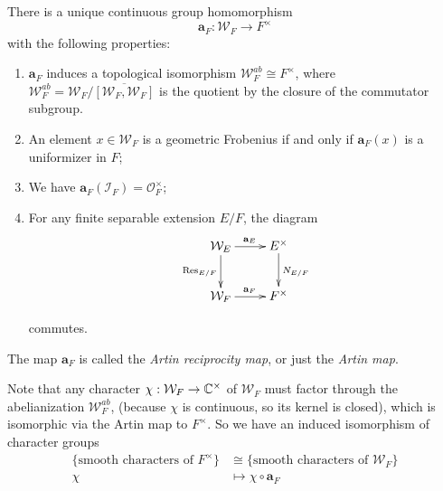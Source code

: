 \begin{thm}\label{thm:lcf}
	There is a unique continuous group homomorphism
	\[\mathbf{a}_F: \mathcal{W}_F\to F^\times\]
	with the following properties:
	\begin{enumerate}
		\item $\mathbf{a}_F$ induces a topological isomorphism $\mathcal{W}_F^{ab}\cong F^\times$, where $\mathcal{W}_F^{ab} = \mathcal{W}_F/\overline{[\mathcal{W}_F, \mathcal{W}_F]}$ is the quotient by the closure of the commutator subgroup.
		\item An element $x\in \mathcal{W}_F$ is a geometric Frobenius if and only if $\mathbf{a}_F(x)$ is a uniformizer in $F$;
		\item We have $\mathbf{a}_F(\mathcal{I}_F) = \mathcal{O}_F^\times$;
		\item For any finite separable extension $E/F$, the diagram 
		$$\xymatrix{
			\mathcal W_E \ar[r]^{\mathbf a_E} \ar[d]_{\Res_{E/F}} & E^\times \ar[d]^{N_{E/F}} \\
			\mathcal W_F \ar[r]^{\mathbf a_F} & F^\times
		}$$
		
		commutes.
	\end{enumerate}
	The map $\mathbf{a}_F$ is called the \emph{Artin reciprocity map}, or just the \emph{Artin map}.
\end{thm}
Note that any character $\chi: \mathcal{W}_F\to \mathbb{C}^\times$ of $\mathcal{W}_F$ must factor through the abelianization $\mathcal{W}_F^{ab}$, (because $\chi$ is continuous, so its kernel is closed), which is isomorphic via the Artin map to $F^\times$. So we have an induced isomorphism of character groups
\begin{align*}
	\{\text{smooth characters of }F^\times\} &\cong \{\text{smooth characters of }\mathcal{W}_F\}\\
	\chi &\mapsto \chi\circ\mathbf{a}_F
\end{align*}
